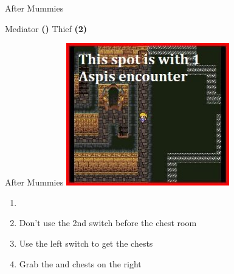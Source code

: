 \begin{paracol}{2}
\begin{menu}{After Mummies}
    \varwb
    \begin{jobMenu}
        \faris Mediator \textbf{(\pointUp)}
        \cara Thief \textbf{(2\pointRight)} \ability{!\escape}
    \end{jobMenu}
    \varwe
\end{menu}

\switchcolumn
\begin{steproute}{After Mummies}
    \includegraphics[scale=0.448]{../Graphics/Steps/174. Pyramid Enc 1.jpg}
\end{steproute}

\switchcolumn
\begin{enumerate}[resume]
    \item {}
    \item Don't use the 2nd switch before the chest room
    \item Use the left switch to get the chests
    \item Grab the  and  chests on the right
\end{enumerate}


\end{paracol}
